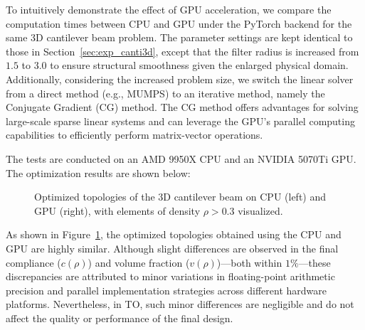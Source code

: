 \documentclass[mathpazo]{cicp}
\begin{document}
To intuitively demonstrate the effect of GPU acceleration, we compare the computation times between CPU and GPU under the PyTorch backend for the same 3D cantilever beam problem. The parameter settings are kept identical to those in Section~\ref{sec:exp_canti3d}, except that the filter radius is increased from 
$1.5$ to $3.0$ to ensure structural smoothness given the enlarged physical domain. Additionally, considering the increased problem size, we switch the linear solver from a direct method (e.g., MUMPS) to an iterative method, namely the Conjugate Gradient (CG) method. The CG method offers advantages for solving large-scale sparse linear systems and can leverage the GPU's parallel computing capabilities to efficiently perform matrix-vector operations.

The tests are conducted on an AMD 9950X CPU and an NVIDIA 5070Ti GPU. The optimization results are shown below:
\begin{figure}[htp]
	\centering
	\caption{Optimized topologies of the 3D cantilever beam on CPU (left) and GPU (right), with elements of density $\rho > 0.3$ visualized.}
	\label{fig:canti3d_device_compare}
\end{figure}

As shown in Figure~\ref{fig:canti3d_device_compare}, the optimized topologies obtained using the CPU and GPU are highly similar. Although slight differences are observed in the final compliance ($c(\rho)$) and volume fraction ($v(\rho)$)—both within $1\%$---these discrepancies are attributed to minor variations in floating-point arithmetic precision and parallel implementation strategies across different hardware platforms. Nevertheless, in TO, such minor differences are negligible and do not affect the quality or performance of the final design.
\end{document}
